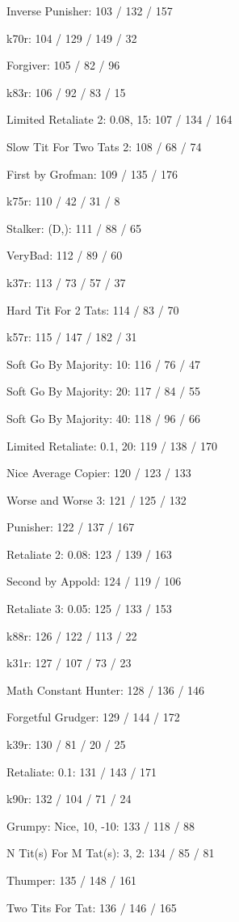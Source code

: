 \item Inverse Punisher: 103 / 132 / 157
\item k70r: 104 / 129 / 149 / 32
\item Forgiver: 105 / 82 / 96
\item k83r: 106 / 92 / 83 / 15
\item Limited Retaliate 2: 0.08, 15: 107 / 134 / 164
\item Slow Tit For Two Tats 2: 108 / 68 / 74
\item First by Grofman: 109 / 135 / 176
\item k75r: 110 / 42 / 31 / 8
\item Stalker: (D,): 111 / 88 / 65
\item VeryBad: 112 / 89 / 60
\item k37r: 113 / 73 / 57 / 37
\item Hard Tit For 2 Tats: 114 / 83 / 70
\item k57r: 115 / 147 / 182 / 31
\item Soft Go By Majority: 10: 116 / 76 / 47
\item Soft Go By Majority: 20: 117 / 84 / 55
\item Soft Go By Majority: 40: 118 / 96 / 66
\item Limited Retaliate: 0.1, 20: 119 / 138 / 170
\item Nice Average Copier: 120 / 123 / 133
\item Worse and Worse 3: 121 / 125 / 132
\item Punisher: 122 / 137 / 167
\item Retaliate 2: 0.08: 123 / 139 / 163
\item Second by Appold: 124 / 119 / 106
\item Retaliate 3: 0.05: 125 / 133 / 153
\item k88r: 126 / 122 / 113 / 22
\item k31r: 127 / 107 / 73 / 23
\item Math Constant Hunter: 128 / 136 / 146
\item Forgetful Grudger: 129 / 144 / 172
\item k39r: 130 / 81 / 20 / 25
\item Retaliate: 0.1: 131 / 143 / 171
\item k90r: 132 / 104 / 71 / 24
\item Grumpy: Nice, 10, -10: 133 / 118 / 88
\item N Tit(s) For M Tat(s): 3, 2: 134 / 85 / 81
\item Thumper: 135 / 148 / 161
\item Two Tits For Tat: 136 / 146 / 165
